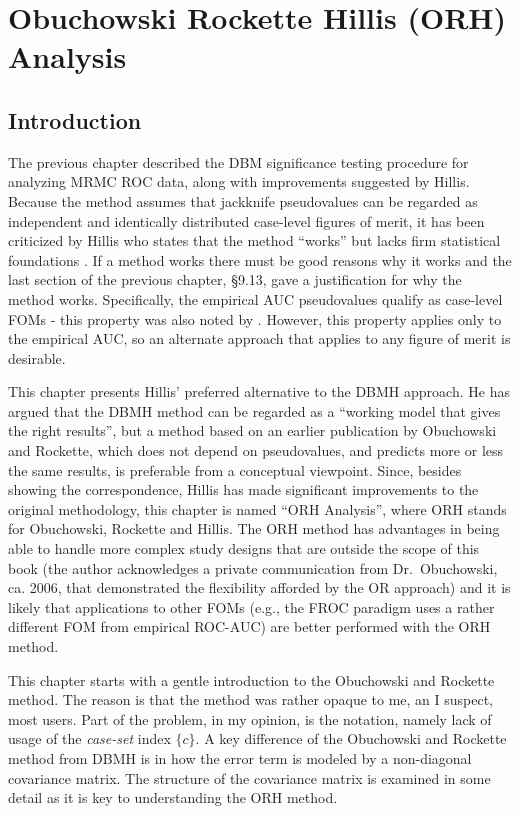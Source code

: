 \documentclass[
]{book}
\begin{document}
\hypertarget{ORHAnalysis}{%
\chapter{Obuchowski Rockette Hillis (ORH) Analysis}\label{ORHAnalysis}}

\hypertarget{introduction-2}{%
\section{Introduction}\label{introduction-2}}

The previous chapter described the DBM significance testing procedure \citep{RN204} for analyzing MRMC ROC data, along with improvements suggested by Hillis. Because the method assumes that jackknife pseudovalues can be regarded as independent and identically distributed case-level figures of merit, it has been criticized by Hillis who states that the method ``works'' but lacks firm statistical foundations \citep{RN1772, RN1865, RN1866}. If a method works there must be good reasons why it works and the last section of the previous chapter, §9.13, gave a justification for why the method works. Specifically, the empirical AUC pseudovalues qualify as case-level FOMs - this property was also noted by \citep{RN1395}. However, this property applies only to the empirical AUC, so an alternate approach that applies to any figure of merit is desirable.

This chapter presents Hillis' preferred alternative to the DBMH approach. He has argued that the DBMH method can be regarded as a ``working model that gives the right results'', but a method based on an earlier publication \citep{RN1450} by Obuchowski and Rockette, which does not depend on pseudovalues, and predicts more or less the same results, is preferable from a conceptual viewpoint. Since, besides showing the correspondence, Hillis has made significant improvements to the original methodology, this chapter is named ``ORH Analysis'', where ORH stands for Obuchowski, Rockette and Hillis. The ORH method has advantages in being able to handle more complex study designs \citep{RN2508} that are outside the scope of this book (the author acknowledges a private communication from Dr.~Obuchowski, ca. 2006, that demonstrated the flexibility afforded by the OR approach) and it is likely that applications to other FOMs (e.g., the FROC paradigm uses a rather different FOM from empirical ROC-AUC) are better performed with the ORH method.

This chapter starts with a gentle introduction to the Obuchowski and Rockette method. The reason is that the method was rather opaque to me, an I suspect, most users. Part of the problem, in my opinion, is the notation, namely lack of usage of the \emph{case-set} index \(\{c\}\). A key difference of the Obuchowski and Rockette method from DBMH is in how the error term is modeled by a non-diagonal covariance matrix. The structure of the covariance matrix is examined in some detail as it is key to understanding the ORH method.
\end{document}
